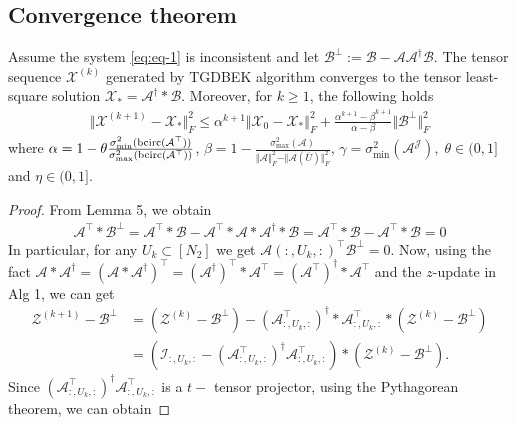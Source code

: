 \documentclass[aspectratio=169]{beamer}
\def\bcirc{{\rm bcirc}}
\def\fm#1{\mathcal{#1}}
\def\fm#1{\mathcal{#1}}
\def \a#1{\fm A_{:, #1, :}}
\begin{document}
\subsection{Convergence theorem}
\begin{frame}{}

\begin{theorem} Assume the system  \eqref{eq:eq-1} is inconsistent and let $\fm B^\perp := \fm B - \fm A \fm A^\dagger \fm B$. The tensor sequence $\fm X^{(k)}$ generated  by TGDBEK algorithm  converges to the  tensor least-square solution $\fm X_\ast = \fm A^\dagger * \fm B$. Moreover, for $k\geq 1$, the following holds
\begin{align}
    \Vert \fm X ^{(k+1)} - \fm X_\ast \Vert_F^2 \leq \alpha^{k+1}\Vert \fm X_0 - \fm X_\ast \Vert_F^2 + \frac{\alpha^{k+1}-\beta^{k+1}}{\alpha - \beta}\Vert \fm B^\perp \Vert_F^2
\end{align}
where $ \alpha = 1 - \theta \frac{\sigma_{\min}^2(\bcirc(\fm A^\top))}{\sigma^2_{\max}(\bcirc(\fm A^\top ))}$, $\beta = 1- \frac{\sigma^2_{\max}(\fm A)}{\Vert \fm A \Vert^2_F - \Vert \fm A(\overline{U}) \Vert_F^2}$, $\gamma = \sigma^2_{\min}(\fm A^{\fm J}), \; \theta \in (0,1]$ and $\eta \in (0, 1]$.
\end{theorem} 
\end{frame}
\begin{frame}{}
    \begin{proof} From Lemma 5, we obtain 
\begin{align*}
    \fm A^\top *\fm B^\perp  =\fm A^\top  *\fm B - \fm A^\top * \fm A * \fm A^\dagger * \fm B =\fm A ^\top * \fm B  - \fm A ^\top * \fm B = 0
\end{align*}
In particular, for any $U_k \subset [N_2]$  we get $\fm A(:, U_k, :)^\top \fm B^\perp = 0$.
Now, using the fact $\fm A * \fm A^\dagger = \left(\fm A * \fm  A^\dagger \right)^\top = (\fm A^\dagger)^\top * \fm A ^\top = (\fm A^\top )^\dagger * \fm A^\top   $  and the $z$-update in Alg 1, we can get
\begin{align*}
    \fm Z^{(k+1)} - \fm B^\perp  & = \left(\fm Z^{(k)} - \fm B^\perp\right) - \left(\fm A^\top_{:, {U_k}, :} \right)^\dagger* \fm A^\top_{:, U_k, :} *\left( \fm Z ^{(k)}-\fm B^\perp \right)\\
    & = \left(\fm I_{:, U_k, :} - \left( \a{U_k}^\top\right) ^\dagger \a{U_k}^\top\right)*\left( \fm Z^{(k)}- \fm B^\perp \right).
\end{align*}
Since $\left( \a{U_k}^\top\right) ^\dagger \a{U_k}^\top$  is a $t-$ tensor projector,  using the Pythagorean theorem,  we can obtain

\end{proof}
\end{frame}
\end{document}
